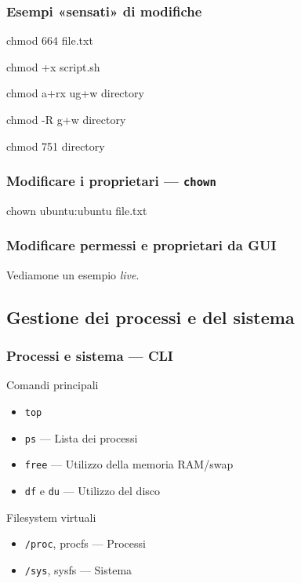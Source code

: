 \documentclass{beamer}
\newenvironment{shell*}{\par\vspace{.5em}\begin{beamercolorbox}[rounded=true,sep=.2em]{shell snippet}\ttfamily {\color{red}\#}}{\end{beamercolorbox}}
\begin{document}
\begin{frame}[t]
  \frametitle{Esempi «sensati» di modifiche}
  \begin{shell*}
    chmod 664 file.txt
  \end{shell*}

  \begin{shell*}
    chmod +x script.sh
  \end{shell*}

  \begin{shell*}
    chmod a+rx ug+w directory
  \end{shell*}

  \begin{shell*}
    chmod -R g+w directory
  \end{shell*}

  \begin{shell*}
    chmod 751 directory
  \end{shell*}

\end{frame}

\begin{frame}
  \frametitle{Modificare i proprietari --- \texttt{chown}}

  \begin{shell*}
    chown \alert<2>{ubuntu}:\alert<3>{ubuntu} file.txt
  \end{shell*}
  
\end{frame}

\begin{frame}
  \frametitle{Modificare permessi e proprietari da GUI}
  
  Vediamone un esempio \textit{live}.
\end{frame}

\subsection{Gestione dei processi e del sistema}

\begin{frame}[t]
  \frametitle{Processi e sistema --- CLI}
  
  \begin{block}{Comandi principali}
    \begin{itemize}
      \item \texttt{top}
      \item \texttt{ps} --- Lista dei processi
      \item \texttt{free} --- Utilizzo della memoria RAM/swap
      \item \texttt{df} e \texttt{du} --- Utilizzo del disco
    \end{itemize}
  \end{block}

  \begin{block}{Filesystem virtuali}
    \begin{itemize}
      \item \texttt{/proc}, procfs --- Processi
      \item \texttt{/sys}, sysfs --- Sistema
    \end{itemize}
  \end{block}
\end{frame}
\end{document}
